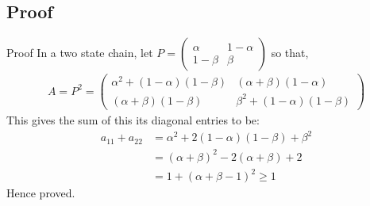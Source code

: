 \documentclass{beamer}
\newcommand{\myvec}[1]{\ensuremath{\begin{pmatrix}#1\end{pmatrix}}}
\begin{document}
\subsection{Proof}
\begin{frame}{Proof}
    In a two state chain, let $P = \myvec{\alpha & 1 - \alpha \\ 1 - \beta & \beta}$
    so that,
    \begin{align}
        A = P^2 =
        \myvec{\alpha^2 + (1 - \alpha)(1 - \beta ) & (\alpha + \beta )(1 - \alpha) \\ (\alpha + \beta )(1 - \beta) & \beta^2 + (1 - \alpha)(1 - \beta)}
    \end{align}
    This gives the sum of this its diagonal entries to be:
    \begin{align}
        a_{11} + a_{22} &= \alpha^2 + 2(1 - \alpha)(1 - \beta )+ \beta^2
        \\
        &= (\alpha + \beta)^2 - 2(\alpha + \beta ) + 2 
        \\
        \label{eq:condition}
        &= 1+(\alpha + \beta - 1)^2 \geq 1 
    \end{align}
    Hence proved.
\end{frame}
\end{document}
